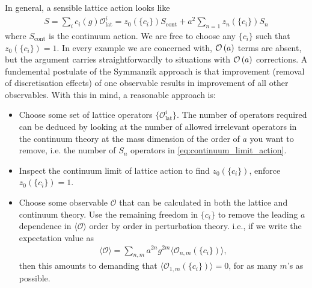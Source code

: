 In general, a sensible lattice action looks like
\begin{align}
  S = \sum_{i} c_i(g) \mathcal{O}^i_{\text{lat}} = z_0(\{c_i\}) S_{\text{cont}} + a^2 \sum_{n=1} z_n(\{c_i\}) S_n
  \label{eq:continuum_limit_action}
\end{align}
where $S_{\text{cont}}$ is the continuum action. We are free to choose any $\{c_i\}$ such that $z_0(\{c_i\}) = 1$. In every example we are concerned with, $\mathcal{O}\left( a \right)$ terms are absent, but the argument carries straightforwardly to situations with $\mathcal{O}\left( a \right)$ corrections. A fundemental postulate of the Symmanzik approach is that improvement (removal of discretisation effects) of one observable results in improvement of all other observables. With this in mind, a reasonable approach is:
\begin{itemize}
\item
  Choose some set of lattice operators $\{\mathcal{O}^i_{\text{lat}}\}$. The number of operators required can be deduced by looking at the number of allowed irrelevant operators in the continuum theory at the mass dimension of the order of $a$ you want to remove, i.e. the number of $S_n$ operators in \eqref{eq:continuum_limit_action}.
\item
  Inspect the continuum limit of lattice action to find $z_0(\{c_i\})$, enforce $z_0(\{c_i\})=1$.
\item
  Choose some observable $\mathcal{O}$ that can be calculated in both the lattice and continuum theory. Use the remaining freedom in $\{c_i\}$ to remove the leading $a$ dependence in $\langle \mathcal{O}\rangle$ order by order in perturbation theory. i.e., if we write the expectation value as
  \begin{align}
    \langle \mathcal{O} \rangle = \sum_{n,m} a^{2n} g^{2m}\langle \mathcal{O}_{n,m}(\{c_i\}) \rangle,
  \end{align}
  then this amounts to demanding that $\langle \mathcal{O}_{1,m}(\{c_i\})\rangle = 0$, for as many $m$'s as possible.
\end{itemize}

